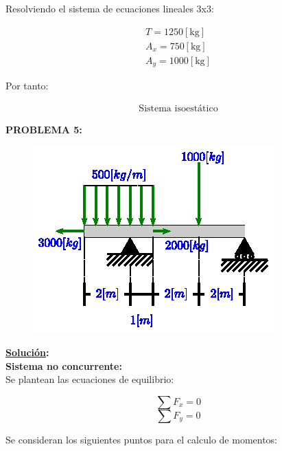 \documentclass[letter,10pt,twoside]{article}
\begin{document}
Resolviendo el sistema de ecuaciones lineales 3x3:

\begin{equation*}
\boxed{
    \begin{array}{l}
        T = 1250[\text{kg}] \\
        A_x = 750[\text{kg}] \\
        A_y = 1000[\text{kg}]
    \end{array}
}
\end{equation*}

Por tanto:

\begin{equation*}
\boxed{
    \begin{array}{l}
        \text{Sistema isoestático}
    \end{array}
}
\end{equation*}

\vspace{1.0cm}

\colorbox{blue!25}{\textbf{PROBLEMA 5:}}

\begin{figure}[H]
\centering
\includegraphics[scale=1.8]{resources/f05.eps}
\end{figure}

\textbf{\underline{Solución}:} \\

\textbf{Sistema no concurrente:} \\
Se plantean las ecuaciones de equilibrio:

\begin{equation*}
    \sum{F_x} = 0
\end{equation*}
\begin{equation*}
    \sum{F_y} = 0
\end{equation*}

Se consideran los siguientes puntos para el calculo de momentos:
\end{document}
